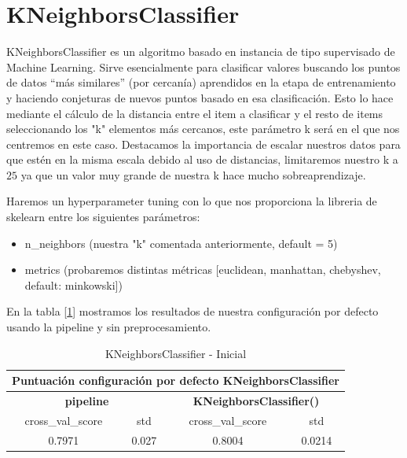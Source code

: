 \documentclass[12pt,twoside]{report}
\begin{document}
\section*{KNeighborsClassifier}
\label{section:knn}

KNeighborsClassifier es un algoritmo basado en instancia de tipo supervisado de Machine Learning. Sirve esencialmente para clasificar valores buscando los puntos de datos “más similares” (por cercanía) aprendidos en la etapa de entrenamiento y haciendo conjeturas de nuevos puntos basado en esa clasificación. Esto lo hace mediante el cálculo de la distancia entre el item a clasificar y el resto de items seleccionando los "k" elementos más cercanos, este parámetro k será en el que nos centremos en este caso. Destacamos la importancia de escalar nuestros datos para que estén en la misma escala debido al uso de distancias, limitaremos nuestro k a $25$ ya que un valor muy grande de nuestra k hace mucho sobreaprendizaje.

Haremos un hyperparameter tuning con lo que nos proporciona la libreria de skelearn \cite{knn} entre los siguientes parámetros:
\begin{itemize}
	\item n\_neighbors (nuestra "k" comentada anteriormente, default = 5)
	\item metrics (probaremos distintas métricas [euclidean, manhattan, chebyshev, default: minkowski])
\end{itemize}

En la tabla [\ref{knn:inicial}] mostramos los resultados de nuestra configuración por defecto usando la pipeline y sin preprocesamiento.

\begin{table}[h]
\begin{center}
  \begin{tabular}{|c|c|c|c|}
  \hline
    \multicolumn{4}{|c|}{\textbf{Puntuación configuración por defecto KNeighborsClassifier}} \\  
    \hline
    \multicolumn{2}{|c|}{\textbf{pipeline}} & \multicolumn{2}{|c|}{\textbf{KNeighborsClassifier()}}\\    
    \hline
   cross\_val\_score & std & cross\_val\_score & std  \\ 
   \hline
0.7971 & 0.027 & 0.8004 & 0.0214  \\ 
\hline
  \end{tabular}
  \end{center}
\caption{KNeighborsClassifier - Inicial}
\label{knn:inicial}
\end{table}
\end{document}
